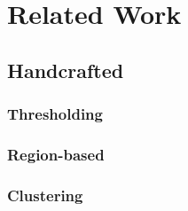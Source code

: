 \section{Related Work}

  \subsection{Handcrafted}

    \subsubsection{Thresholding}

      \Blindtext[1]

    \subsubsection{Region-based}

      \Blindtext[1]

    \subsubsection{Clustering}

      \Blindtext[1]
